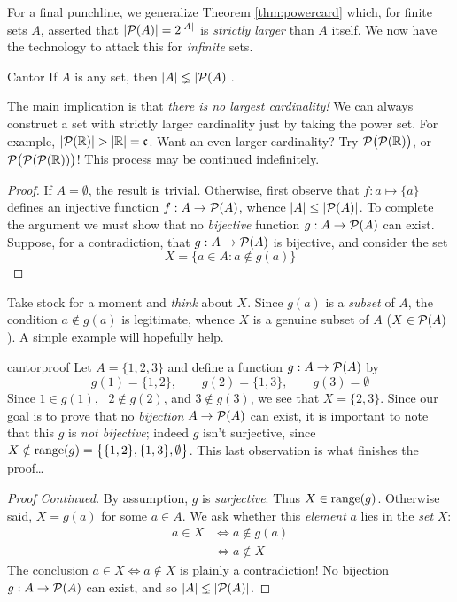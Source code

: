 
For a final punchline, we generalize Theorem \ref{thm:powercard} which, for finite sets $A$, asserted that $\left| \mathcal{P}(A)\right|=2^{\left| A\right|}$ is \emph{strictly larger} than $A$ itself. We now have the technology to attack this for \emph{infinite} sets.

\begin{thm}{Cantor}{}
	If $A$ is any set, then $\left| A\right|\lneq\left| \mathcal{P}(A)\right|$.
\end{thm}

The main implication is that \emph{there is no largest cardinality!} We can always construct a set with strictly larger cardinality just by taking the power set. For example, $\nm{\cP(\R)}>\nm\R=\fc$. Want an even larger cardinality? Try $\mathcal{P}\bigl(\mathcal{P}(\mathbb{R})\bigr)$, or $\mathcal{P}\bigl(\mathcal{P}(\mathcal{P}(\mathbb{R}))\bigr)$! This process may be continued indefinitely.

\begin{proof}
	If $A=\emptyset$, the result is trivial. Otherwise, first observe that $f:a\mapsto\{a\}$ defines an injective function $f:A\to\mathcal{P}(A)$, whence $\left| A\right|\le\left| \mathcal{P}(A)\right|$.\smallbreak
	To complete the argument we must show that no \emph{bijective} function $g:A\to\mathcal{P}(A)$ can exist. Suppose, for a contradiction, that $g:A\to\mathcal{P}(A)$ is bijective, and consider the set 
	  \[
	  	X=\bigl\{a\in A:a\notin g(a)\bigr\} \tag*{\phantom\qedhere}
	  \]
\end{proof}

Take stock for a moment and \emph{think} about $X$. Since $g(a)$ is a \emph{subset} of $A$, the condition $a\not\in g(a)$ is legitimate, whence $X$ is a genuine subset of $A$ ($X\in\mathcal{P}(A)$). A simple example will hopefully help.
  
\begin{example}{}{cantorproof}
	Let $A=\{1,2,3\}$ and define a function $g:A\to\mathcal{P}(A)$ by
  \[
  	g(1)=\{1,2\},\qquad g(2)=\{1,3\},\qquad g(3)=\emptyset
  \]
  Since $1\in g(1)$, \ $2\notin g(2)$, and $3\notin g(3)$, we see that $X=\{2,3\}$. Since our goal is to prove that no \emph{bijection} $A\to\mathcal{P}(A)$ can exist, it is important to note that this $g$ is \emph{not bijective}; indeed $g$ isn't surjective, since $X\notin\operatorname{range}(g)=\bigl\{\{1,2\},\{1,3\},\emptyset\bigr\}$. This last observation is what finishes the proof\ldots
\end{example}

\begin{proof}[Proof Continued]  
	By assumption, $g$ is \emph{surjective}. Thus $X\in\operatorname{range}(g)$. Otherwise said, $X=g(a)$ for some $a\in A$. We ask whether this \emph{element} $a$ lies in the \emph{set} $X$:
	\begin{align*}
		a\in X&\iff a\notin g(a)\tag{definition of $X$}\\
		&\iff a\notin X\tag{since $X=g(a)$}
	\end{align*}
	The conclusion $a\in X\Longleftrightarrow a\notin X$ is plainly a contradiction! No bijection $g:A\to\mathcal{P}(A)$ can exist, and so $\left| A\right|\lneq\left| \mathcal{P}(A)\right|$.
\end{proof}

